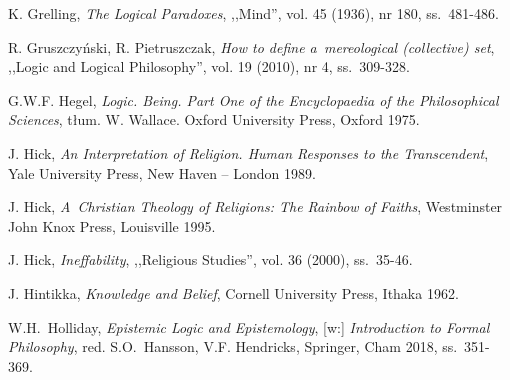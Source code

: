 \begin{thebibliography}{100}
K. Grelling, \textit{The Logical Paradoxes}, ,,Mind'', vol. 45 (1936), nr 180, ss.~481-486.

R. Gruszczyński, R. Pietruszczak, \textit{How to define a~mereological (collective) set}, ,,Logic and Logical Philosophy'', vol. 19 (2010), nr 4, ss.~309-328.



G.W.F. Hegel, \textit{Logic. Being. Part One of the Encyclopaedia of the Philosophical Sciences}, tłum. W. Wallace. Oxford University Press, Oxford 1975.


J. Hick, \textit{An Interpretation of Religion. Human Responses to the Transcendent}, Yale University Press, New Haven -- London 1989.

J. Hick, \textit{A~Christian Theology of Religions: The Rainbow of Faiths}, Westminster John Knox Press, Louisville 1995.

J. Hick, \textit{Ineffability}, ,,Religious Studies'', vol. 36 (2000), ss.~35-46.

J. Hintikka, \textit{Knowledge and Belief}, Cornell University Press, Ithaka 1962.

W.H.~Holliday, \textit{Epistemic Logic and Epistemology}, [w:] \textit{Introduction to Formal Philosophy}, red. S.O.~Hansson, V.F. Hendricks, Springer, Cham 2018, ss.~351-369.


\end{thebibliography}
